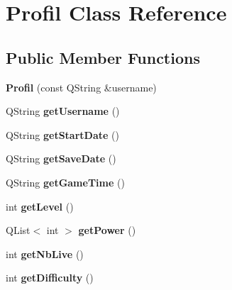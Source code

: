 \hypertarget{class_profil}{}\section{Profil Class Reference}
\label{class_profil}
\subsection*{Public Member Functions}
\begin{DoxyCompactItemize}
\item 
\hypertarget{class_profil_ad874b5e5885c947739f7dfa8a8932442}{}{\bfseries Profil} (const Q\+String \&username)\label{class_profil_ad874b5e5885c947739f7dfa8a8932442}

\item 
\hypertarget{class_profil_af0ab359fbf8feb7e703293c9025e8d36}{}Q\+String {\bfseries get\+Username} ()\label{class_profil_af0ab359fbf8feb7e703293c9025e8d36}

\item 
\hypertarget{class_profil_aa51ac79c413e575f32166eac7694c313}{}Q\+String {\bfseries get\+Start\+Date} ()\label{class_profil_aa51ac79c413e575f32166eac7694c313}

\item 
\hypertarget{class_profil_a9858f08dfaff3155450e2f2a66ae50cf}{}Q\+String {\bfseries get\+Save\+Date} ()\label{class_profil_a9858f08dfaff3155450e2f2a66ae50cf}

\item 
\hypertarget{class_profil_a8c75d1768cb705d48d8d1f0519512e55}{}Q\+String {\bfseries get\+Game\+Time} ()\label{class_profil_a8c75d1768cb705d48d8d1f0519512e55}

\item 
\hypertarget{class_profil_a5fd30de19283f6ae22a7232dd22e2afa}{}int {\bfseries get\+Level} ()\label{class_profil_a5fd30de19283f6ae22a7232dd22e2afa}

\item 
\hypertarget{class_profil_aea2c7ddbba5567c777b37293f5fa2aaa}{}Q\+List$<$ int $>$ {\bfseries get\+Power} ()\label{class_profil_aea2c7ddbba5567c777b37293f5fa2aaa}

\item 
\hypertarget{class_profil_a4747a4a9cf7d22203bc316f3a0753033}{}int {\bfseries get\+Nb\+Live} ()\label{class_profil_a4747a4a9cf7d22203bc316f3a0753033}

\item 
\hypertarget{class_profil_a10c2f4863000e5525f8504a22ccf1260}{}int {\bfseries get\+Difficulty} ()\label{class_profil_a10c2f4863000e5525f8504a22ccf1260}


\end{DoxyCompactItemize}
